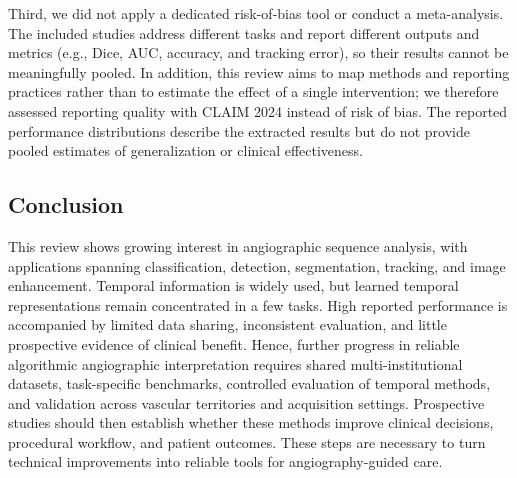 Third, we did not apply a dedicated risk-of-bias tool or conduct a meta-analysis. The included studies address different tasks and report different outputs and metrics (e.g., Dice, AUC, accuracy, and tracking error), so their results cannot be meaningfully pooled. In addition, this review aims to map methods and reporting practices rather than to estimate the effect of a single intervention; we therefore assessed reporting quality with CLAIM 2024 instead of risk of bias. The reported performance distributions describe the extracted results but do not provide pooled estimates of generalization or clinical effectiveness.

\subsection{Conclusion}

This review shows growing interest in angiographic sequence analysis, with applications spanning classification, detection, segmentation, tracking, and image enhancement. Temporal information is widely used, but learned temporal representations remain concentrated in a few tasks. High reported performance is accompanied by limited data sharing, inconsistent evaluation, and little prospective evidence of clinical benefit. Hence, further progress in reliable algorithmic angiographic interpretation requires shared multi-institutional datasets, task-specific benchmarks, controlled evaluation of temporal methods, and validation across vascular territories and acquisition settings. Prospective studies should then establish whether these methods improve clinical decisions, procedural workflow, and patient outcomes. These steps are necessary to turn technical improvements into reliable tools for angiography-guided care.
